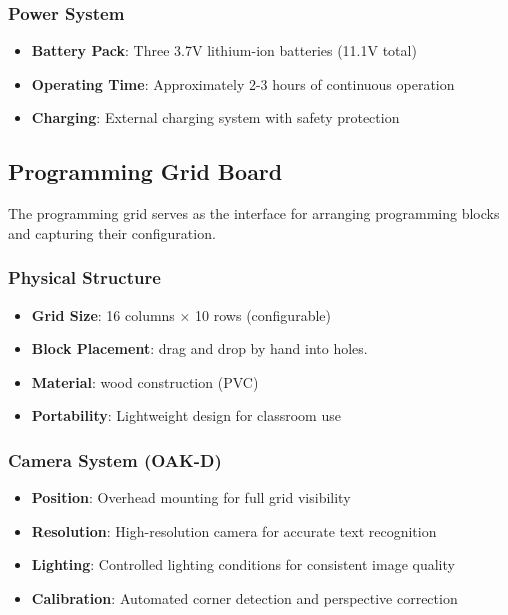 \subsubsection{Power System}
\begin{itemize}
    \item \textbf{Battery Pack}: Three 3.7V lithium-ion batteries (11.1V total)
    \item \textbf{Operating Time}: Approximately 2-3 hours of continuous operation
    \item \textbf{Charging}: External charging system with safety protection
\end{itemize}

\subsection{Programming Grid Board}

The programming grid serves as the interface for arranging programming blocks and capturing their configuration.

\subsubsection{Physical Structure}
\begin{itemize}
    \item \textbf{Grid Size}: 16 columns × 10 rows (configurable)
    \item \textbf{Block Placement}:  drag and drop by hand into holes.
    \item \textbf{Material}: wood construction (PVC)
    \item \textbf{Portability}: Lightweight design for classroom use
\end{itemize}

\subsubsection{Camera System (OAK-D)}
\begin{itemize}
    \item \textbf{Position}: Overhead mounting for full grid visibility
    \item \textbf{Resolution}: High-resolution camera for accurate text recognition
    \item \textbf{Lighting}: Controlled lighting conditions for consistent image quality
    \item \textbf{Calibration}: Automated corner detection and perspective correction
\end{itemize}

